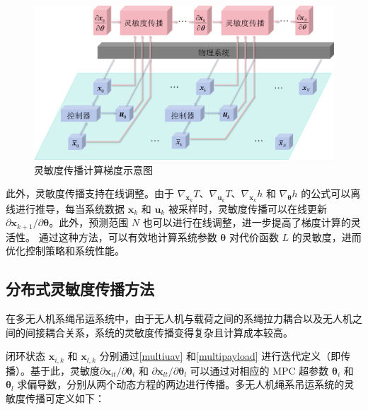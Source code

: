 \documentclass[lang=chs, degree=master, blindreview=false, winfonts=true]{yanputhesis}
\begin{document}
\begin{figure}[hbt!]
	\centering
	\includegraphics[width=32pc]{picture/图片1.png} 
	\caption{灵敏度传播计算梯度示意图} 
	\label{system}
\end{figure}
此外，灵敏度传播支持在线调整。由于 $\nabla_{\bm{x}_k} T$、$\nabla_{\bm{u}_k} T$、$\nabla_{\bm{x}_k} h$ 和 $\nabla_{\bm{\theta}} h$ 的公式可以离线进行推导，每当系统数据 $\bm{x}_k$ 和 $\bm{u}_k$ 被采样时，灵敏度传播可以在线更新 ${\partial \bm{x}_{k+1}}/{\partial \bm{\theta}}$。此外，预测范围 $N$ 也可以进行在线调整，进一步提高了梯度计算的灵活性。
通过这种方法，可以有效地计算系统参数 $\bm{\theta}$ 对代价函数 $L$ 的灵敏度，进而优化控制策略和系统性能。

\subsection{分布式灵敏度传播方法}
在多无人机系绳吊运系统中，由于无人机与载荷之间的系绳拉力耦合以及无人机之间的间接耦合关系，系统的灵敏度传播变得复杂且计算成本较高。

闭环状态 \( \bm x_{i,k} \) 和 \( \bm x_{l,k} \) 分别通过\autoref{multiuav} 和\autoref{multipayload} 进行迭代定义（即传播）。基于此，灵敏度\( {\partial \bm x_{it}}/{\partial \bm \theta_i} \) 和 \( {\partial \bm x_{lt}}/{\partial \bm \theta_l} \) 可以通过对相应的 MPC 超参数 \( \bm \theta_i \) 和 \( \bm \theta_l \) 求偏导数，分别从两个动态方程的两边进行传播。多无人机绳系吊运系统的灵敏度传播可定义如下：
\end{document}
